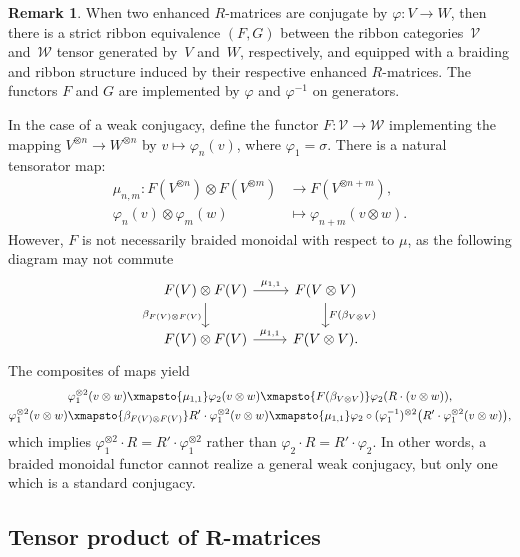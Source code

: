 \documentclass[pdftex]{sigma}
\numberwithin{equation}{section}
\theoremstyle{definition}
\newtheorem{Remark}[Theorem]{Remark}
\begin{document}
\begin{Remark}
 When two enhanced $R$-matrices are conjugate by $\varphi\colon V\to W$, then there is a strict ribbon equivalence $(F,G)$ between the ribbon categories~$\mathcal{V}$ and~$\mathcal{W}$ tensor generated by~$V$ and~$W$, respectively, and equipped with a braiding and ribbon structure induced by their respective enhanced $R$-matrices. The functors $F$ and $G$ are implemented by $\varphi$ and $\varphi^{-1}$ on generators.

In the case of a weak conjugacy, define the functor $F:\mathcal{V}\to\mathcal{W}$ implementing the mapping $V^{\otimes n} \to W^{\otimes n}$ by $v\mapsto \varphi_n(v)$, where $\varphi_1=\sigma$. There is a natural tensorator map:
\begin{align*} \mu_{n,m}\colon F(V^{\otimes n})\otimes F(V^{\otimes m})&\to F(V^{\otimes n+m}),
 \\
 \varphi_n(v)\otimes \varphi_m(w)&\mapsto\varphi_{n+m}(v\otimes w) .
 \end{align*}
However, $F$ is not necessarily braided monoidal with respect to $\mu$, as the following diagram may not commute
\begin{equation*}
\begin{tikzcd}
 F(V)\otimes F(V) \ar[r,"\mu_{1,1}"] \ar[d,swap,"\beta_{F(V)\otimes F(V)}"] & F(V\otimes V)
 \ar[d,"F(\beta_{V\otimes V})"]
 \\
 F(V)\otimes F(V)\ar[r,"\mu_{1,1}"]& F(V\otimes V).
 \end{tikzcd}
\end{equation*}
The composites of maps yield
\begin{gather*}
\varphi_1^{\otimes 2}(v\otimes w)
 \xmapsto{\mu_{1,1}}
 \varphi_2(v\otimes w)
 \xmapsto{F(\beta_{V\otimes V})}
 \varphi_2(R\cdot (v\otimes w)),
 \\
\varphi_1^{\otimes 2}(v\otimes w)
 \xmapsto{\beta_{F(V)\otimes F(V)}}
 R'\cdot \varphi_1^{\otimes 2}(v\otimes w)
 \xmapsto{\mu_{1,1}}
 \varphi_2\circ (\varphi_1^{-1})^{\otimes 2}\bigl(R'\cdot \varphi_1^{\otimes 2}(v\otimes w)\bigr),
\end{gather*}
which implies $\varphi_1^{\otimes 2}\cdot R = R'\cdot \varphi_1^{\otimes 2}$ rather than $\varphi_2\cdot R = R'\cdot \varphi_2$. In other words, a braided monoidal functor cannot realize a general weak conjugacy, but only one which is a standard conjugacy.
\end{Remark}

\subsection[Tensor product of R-matrices]{Tensor product of $\boldsymbol{R}$-matrices}
\label{sub.tensor}
\end{document}
